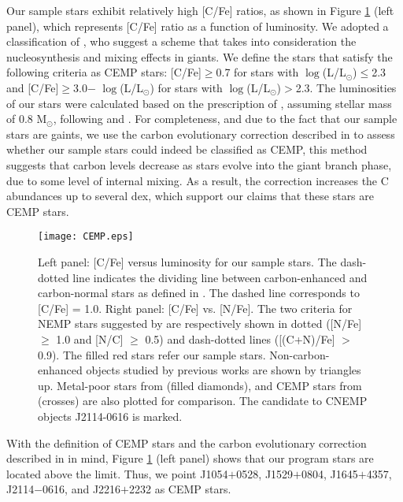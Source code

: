 Our sample stars exhibit relatively high [C/Fe] ratios, as shown
in Figure \ref{fig:C_Fe_L} (left panel), which represents [C/Fe] ratio as a function of luminosity. 
We adopted a classification of \citet{2007ApJ...655..492A}, who suggest a
scheme that takes into consideration the nucleosynthesis and
mixing effects in giants. 
We define the stars that satisfy the
following criteria as CEMP stars: [C/Fe]$\geqslant$0.7 for stars with $\log$(L/L$_\odot$)$\leqslant$2.3 and 
[C/Fe]$\geqslant$3.0$-$ $\log$(L/L$_\odot$) for stars with $\log$(L/L$_\odot$)$>$2.3. The luminosities of our stars were calculated 
based on the prescription of \citet{2007ApJ...655..492A}, assuming stellar mass of 0.8 M$_\odot$, following 
\citet{2005ApJ...632..611A} and \citet{2005ApJ...635..349R}. For completeness, and due to the fact that our sample stars are gaints, we use the carbon evolutionary correction described in \citet{2014ApJ...797...21P} to assess whether our sample stars could indeed be classified as CEMP, this method suggests that carbon levels decrease as stars evolve into the giant branch phase, due to some level of internal mixing.  As a result, the correction increases the C abundances up to several dex, which support our claims that these stars are CEMP stars.




\vspace{5mm}
\begin{figure}[!ht]
\centering
\texttt{[image: CEMP.eps]}
\caption{Left panel: [C/Fe] versus luminosity for our sample stars. The dash-dotted line indicates the dividing line between 
carbon-enhanced and carbon-normal stars as defined in \citet{2007ApJ...655..492A}. The dashed line corresponds to [C/Fe] = 1.0. 
Right panel: [C/Fe] vs. [N/Fe]. The two criteria for NEMP stars suggested by \citet{2012A&A...547A..76P} are respectively shown in dotted 
([N/Fe] $\geq$ 1.0 and [N/C] $\geq$ 0.5) and dash-dotted lines ([(C+N)/Fe] $>$ 0.9).
The filled red stars refer our sample stars. Non-carbon-enhanced objects studied by previous works \citep{2000A&A...354..169G, 2004A&A...416.1117C, 
2004ApJ...607..474H, 2005ApJ...632..611A} are shown by triangles up. Metal-poor stars from \citet{2005A&A...430..655S} (filled diamonds), 
and CEMP stars from \citet{2007ApJ...655..492A} (crosses) are also plotted for comparison. The candidate to CNEMP objects J2114-0616 is marked.}
\label{fig:C_Fe_L}
\end{figure}


With the \citet{2007ApJ...655..492A} definition of CEMP stars and the carbon evolutionary correction described in \citet{2014ApJ...797...21P} in mind, Figure \ref{fig:C_Fe_L} (left panel) shows that our program stars are located above the limit.  
Thus, we point  J1054$+$0528, J1529$+$0804, J1645$+$4357, J2114$-$0616, and J2216$+$2232 as
CEMP stars.


